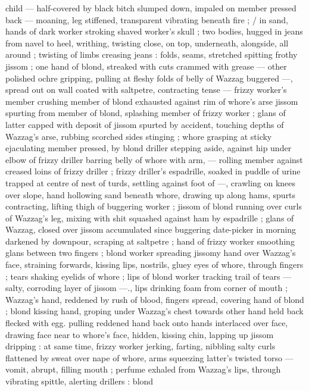 {child --- half-covered by black bitch slumped down, impaled on 
member pressed back --- moaning, leg stiffened, transparent 
vibrating beneath fire ; {\slash} in sand, hands of dark worker stroking 
shaved worker's skull ; two bodies, hugged in jeans from navel to 
heel, writhing, twisting close, on top, underneath, alongside, all 
around ; twisting of limbs creasing jeans : folds, seams, stretched 
spitting frothy jissom ; one hand of blond, streaked with cuts 
crammed with grease --- other polished ochre gripping, pulling at 
fleshy folds of belly of Wazzag buggered ---, spread out on wall 
coated with saltpetre, contracting tense --- frizzy worker's member 
crushing member of blond exhausted against rim of whore's arse 
jissom spurting from member of blond, splashing member of frizzy 
worker ; glans of latter capped with deposit of jissom spurted by 
accident, touching depths of Wazzag's arse, rubbing scorched sides 
stinging ; whore grasping at sticky ejaculating member pressed, by 
blond driller stepping aside, against hip under elbow of frizzy driller 
barring belly of whore with arm, --- rolling member against creased 
loins of frizzy driller ; frizzy driller's espadrille, soaked in puddle of 
urine trapped at centre of nest of turds, settling against foot of 
---, crawling on knees over slope, hand hollowing sand beneath 
whore, drawing up along hams, spurts contracting, lifting thigh of 
buggering worker ; jissom of blond running over curls of Wazzag's 
leg, mixing with shit squashed against ham by espadrille ; glans of 
Wazzag, closed over jissom accumulated since buggering date-picker 
in morning darkened by downpour, scraping at saltpetre ; hand of 
frizzy worker smoothing glans between two fingers ; blond worker 
spreading jissomy hand over Wazzag's face, straining forwards, 
kissing lips, nostrils, gluey eyes of whore, through fingers ; tears 
shaking eyelids of whore ; lips of blond worker tracking trail of tears 
--- salty, corroding layer of jissom ---., lips drinking foam from corner 
of mouth ; Wazzag's hand, reddened by rush of blood, fingers 
spread, covering hand of blond ; blond kissing hand, groping under 
Wazzag's chest towards other hand held back flecked with egg. 
pulling reddened hand back onto hands interlaced over face, drawing 
face near to whore's face, hidden, kissing chin, lapping up jissom 
dripping : at same time, frizzy worker jerking, farting, nibbling salty 
curls flattened by sweat over nape of whore, arms squeezing latter's 
twisted torso --- vomit, abrupt, filling mouth ; perfume exhaled from 
Wazzag's lips, through vibrating spittle, alerting drillers : blond 
}
